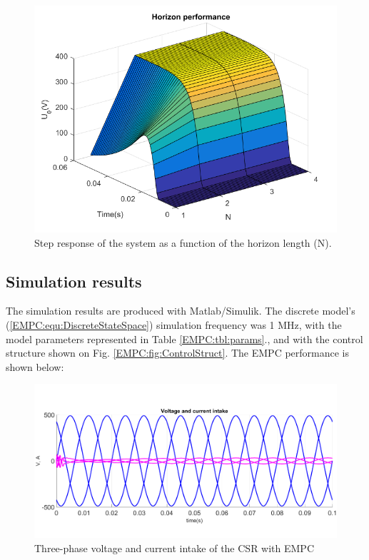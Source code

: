     \begin{figure}[!ht]
        \centering
        \includegraphics[width=\textwidth]{EMPC_PNG_Pics/MultiHorizon.png}
        \caption{Step response of the system as a function of the horizon length (N).}
        \label{EMPC:fig:MultiHorizon}
    \end{figure}

    \subsection{Simulation results}\label{EMPC:sec:Results}

    The simulation results are produced with Matlab/Simulik. The discrete model's (\ref{EMPC:equ:DiscreteStateSpace}) simulation frequency was 1 MHz, with the model parameters represented in Table \ref{EMPC:tbl:params}., and with the control structure shown on Fig. \ref{EMPC:fig:ControlStruct}. The EMPC performance is shown below:

    \begin{figure}[!ht]
        \centering
        \includegraphics[width=\textwidth]{EMPC_PNG_Pics/Result_3fEMPC.png}
        \caption{Three-phase voltage and current intake of the CSR with EMPC}
        \label{EMPC:fig:Result_3fEMPC}
    \end{figure}


